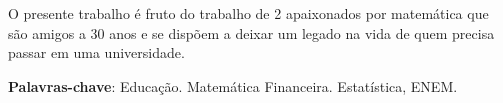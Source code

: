 
\setlength{\absparsep}{18pt} %
\begin{resumo}
 O presente trabalho é fruto do trabalho de 2 apaixonados por matemática que são amigos a 30 anos e se dispõem a deixar um legado na vida de quem precisa passar em uma universidade. 

  \vspace{\onelineskip}

 \textbf{Palavras-chave}: Educação. Matemática Financeira. Estatística, ENEM.
\end{resumo}
